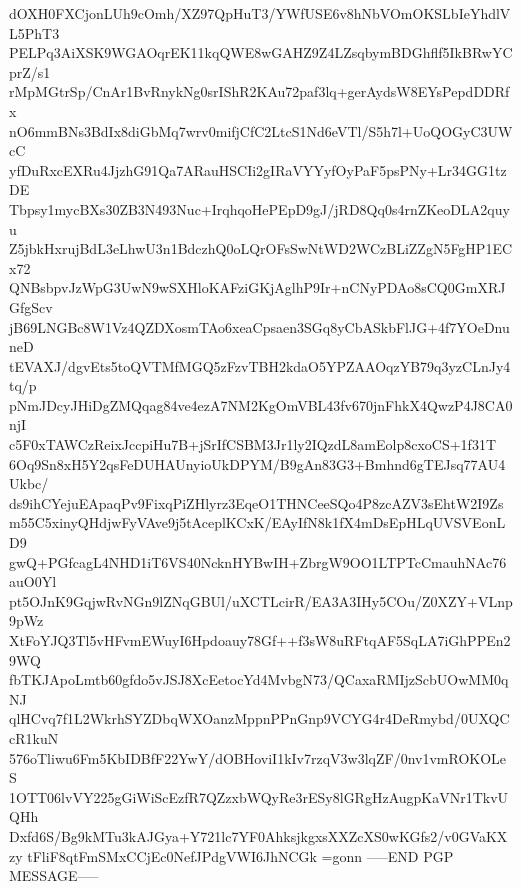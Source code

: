 dOXH0FXCjonLUh9cOmh/XZ97QpHuT3/YWfUSE6v8hNbVOmOKSLbIeYhdlVL5PhT3
PELPq3AiXSK9WGAOqrEK11kqQWE8wGAHZ9Z4LZsqbymBDGhflf5IkBRwYCprZ/s1
rMpMGtrSp/CnAr1BvRnykNg0srIShR2KAu72paf3lq+gerAydsW8EYsPepdDDRfx
nO6mmBNs3BdIx8diGbMq7wrv0mifjCfC2LtcS1Nd6eVTl/S5h7l+UoQOGyC3UWcC
yfDuRxcEXRu4JjzhG91Qa7ARauHSCIi2gIRaVYYyfOyPaF5psPNy+Lr34GG1tzDE
Tbpsy1mycBXs30ZB3N493Nuc+IrqhqoHePEpD9gJ/jRD8Qq0s4rnZKeoDLA2quyu
Z5jbkHxrujBdL3eLhwU3n1BdczhQ0oLQrOFsSwNtWD2WCzBLiZZgN5FgHP1ECx72
QNBsbpvJzWpG3UwN9wSXHloKAFziGKjAglhP9Ir+nCNyPDAo8sCQ0GmXRJGfgScv
jB69LNGBc8W1Vz4QZDXosmTAo6xeaCpsaen3SGq8yCbASkbFlJG+4f7YOeDnuneD
tEVAXJ/dgvEts5toQVTMfMGQ5zFzvTBH2kdaO5YPZAAOqzYB79q3yzCLnJy4tq/p
pNmJDcyJHiDgZMQqag84ve4ezA7NM2KgOmVBL43fv670jnFhkX4QwzP4J8CA0njI
c5F0xTAWCzReixJccpiHu7B+jSrIfCSBM3Jr1ly2IQzdL8amEolp8cxoCS+1f31T
6Oq9Sn8xH5Y2qsFeDUHAUnyioUkDPYM/B9gAn83G3+Bmhnd6gTEJsq77AU4Ukbc/
ds9ihCYejuEApaqPv9FixqPiZHlyrz3EqeO1THNCeeSQo4P8zcAZV3sEhtW2I9Zs
m55C5xinyQHdjwFyVAve9j5tAceplKCxK/EAyIfN8k1fX4mDsEpHLqUVSVEonLD9
gwQ+PGfcagL4NHD1iT6VS40NcknHYBwIH+ZbrgW9OO1LTPTcCmauhNAc76auO0Yl
pt5OJnK9GqjwRvNGn9lZNqGBUl/uXCTLcirR/EA3A3IHy5COu/Z0XZY+VLnp9pWz
XtFoYJQ3Tl5vHFvmEWuyI6Hpdoauy78Gf++f3sW8uRFtqAF5SqLA7iGhPPEn29WQ
fbTKJApoLmtb60gfdo5vJSJ8XcEetocYd4MvbgN73/QCaxaRMIjzScbUOwMM0qNJ
qlHCvq7f1L2WkrhSYZDbqWXOanzMppnPPnGnp9VCYG4r4DeRmybd/0UXQCcR1kuN
576oTliwu6Fm5KbIDBfF22YwY/dOBHoviI1kIv7rzqV3w3lqZF/0nv1vmROKOLeS
1OTT06lvVY225gGiWiScEzfR7QZzxbWQyRe3rESy8lGRgHzAugpKaVNr1TkvUQHh
Dxfd6S/Bg9kMTu3kAJGya+Y721lc7YF0AhksjkgxsXXZcXS0wKGfs2/v0GVaKXzy
tFliF8qtFmSMxCCjEc0NefJPdgVWI6JhNCGk
=gonn
-----END PGP MESSAGE-----
